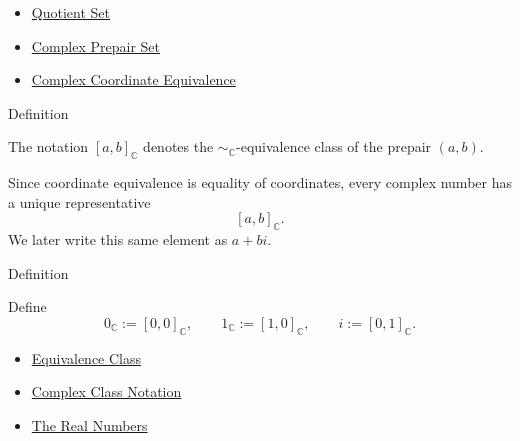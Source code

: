\begin{dependencies}
\begin{itemize}
  \item \hyperref[def:quotient-set]{Quotient Set}
  \item \hyperref[def:complex-prepair-set]{Complex Prepair Set}
  \item \hyperref[def:complex-coordinate-equivalence]{Complex Coordinate Equivalence}
\end{itemize}
\end{dependencies}

\begin{definitionbox}{Definition}
\begin{definition}
\label{def:complex-class-notation}
The notation $[a,b]_{\mathbb{C}}$ denotes the
\(\sim_{\mathbb{C}}\)-equivalence class of the prepair $(a,b)$.
\end{definition}
\end{definitionbox}

\begin{remark*}
Since coordinate equivalence is equality of coordinates, every complex number
has a unique representative
\[
[a,b]_{\mathbb{C}}.
\]
We later write this same element as $a+bi$.
\end{remark*}

\begin{definitionbox}{Definition}
\begin{definition}
\label{def:zero-one-i-in-c}
Define
\[
0_{\mathbb{C}}:=[0,0]_{\mathbb{C}},
\qquad
1_{\mathbb{C}}:=[1,0]_{\mathbb{C}},
\qquad
i:=[0,1]_{\mathbb{C}}.
\]
\end{definition}
\end{definitionbox}

\begin{dependencies}
\begin{itemize}
  \item \hyperref[def:equiv-class]{Equivalence Class}
  \item \hyperref[def:complex-class-notation]{Complex Class Notation}
  \item \hyperref[def:reals]{The Real Numbers}
\end{itemize}
\end{dependencies}
